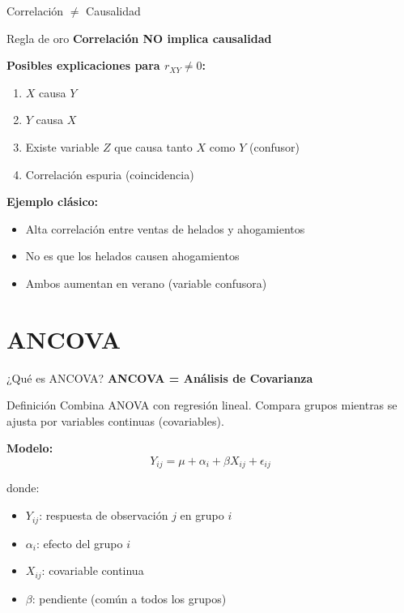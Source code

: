 \documentclass[aspectratio=169]{beamer}
\begin{document}
\begin{frame}{Correlación $\neq$ Causalidad}
\begin{alertblock}{Regla de oro}
\textbf{Correlación NO implica causalidad}
\end{alertblock}

\vspace{0.5cm}
\textbf{Posibles explicaciones para $r_{XY} \neq 0$:}
\begin{enumerate}
    \item $X$ causa $Y$
    \item $Y$ causa $X$
    \item Existe variable $Z$ que causa tanto $X$ como $Y$ (confusor)
    \item Correlación espuria (coincidencia)
\end{enumerate}

\vspace{0.5cm}
\textbf{Ejemplo clásico:}
\begin{itemize}
    \item Alta correlación entre ventas de helados y ahogamientos
    \item No es que los helados causen ahogamientos
    \item Ambos aumentan en verano (variable confusora)
\end{itemize}
\end{frame}

\section{ANCOVA}

\begin{frame}{¿Qué es ANCOVA?}
\textbf{ANCOVA = Análisis de Covarianza}

\vspace{0.3cm}
\begin{block}{Definición}
Combina ANOVA con regresión lineal. Compara grupos mientras se ajusta por variables continuas (covariables).
\end{block}

\vspace{0.5cm}
\textbf{Modelo:}
\[
Y_{ij} = \mu + \alpha_i + \beta X_{ij} + \epsilon_{ij}
\]

donde:
\begin{itemize}
    \item $Y_{ij}$: respuesta de observación $j$ en grupo $i$
    \item $\alpha_i$: efecto del grupo $i$
    \item $X_{ij}$: covariable continua
    \item $\beta$: pendiente (común a todos los grupos)
\end{itemize}
\end{frame}
\end{document}
